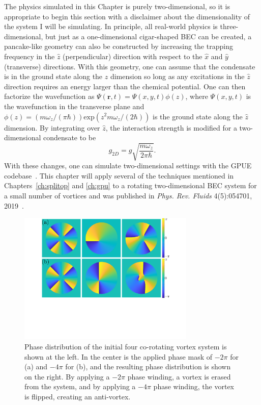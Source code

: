 The physics simulated in this Chapter is purely two-dimensional, so it is appropriate to begin this section with a disclaimer about the dimensionality of the system I will be simulating.
In principle, all real-world physics is three-dimensional, but just as a one-dimensional cigar-shaped BEC can be created, a pancake-like geometry can also be constructed by increasing the trapping frequency in the $\hat z$ (perpendicular) direction with respect to the $\hat x$ and $\hat y$ (transverse) directions.
With this geometry, one can assume that the condensate is in the ground state along the $\hat z$ dimension so long as any excitations in the $\hat z$ direction requires an energy larger than the chemical potential.
One can then factorize the wavefunction as $\Psi(\mathbf{r},t) = \Psi(x, y, t)\phi(z)$, where $\Psi(x, y, t)$ is the wavefunction in the transverse plane and $\phi(z) = (m \omega_z/(\pi\hbar))\text{exp}(z^2 m\omega_z/(2\hbar))$ is the ground state along the $\hat z$ dimension.
By integrating over $\hat z$, the interaction strength is modified for a two-dimensional condensate to be
\begin{equation}
g_{2D} = g \sqrt{\frac{m\omega_z}{2\pi\hbar}}.
\end{equation}
\noindent With these changes, one can simulate two-dimensional settings with the GPUE codebase~\cite{zhang2019, o2017, o2016topo, o2016}.
This chapter will apply several of the techniques mentioned in Chapters~\ref{ch:splitop} and \ref{ch:gpu} to a rotating two-dimensional BEC system for a small number of vortices and was published in \textit{Phys. Rev. Fluids} 4(5):054701, 2019~\cite{zhang2019}.

\begin{figure}
\center \includegraphics[width=0.75\textwidth]{data/2d/phase/phase}

\caption{
Phase distribution of the initial four co-rotating vortex system is shown at the left.
In the center is the applied phase mask of $-2\pi$ for (a) and $-4\pi$ for (b), and the resulting phase distribution is shown on the right.
By applying a $-2\pi$ phase winding, a vortex is erased from the system, and by applying a $-4\pi$ phase winding, the vortex is flipped, creating an anti-vortex.
}
\label{fig:phase}
\end{figure}

